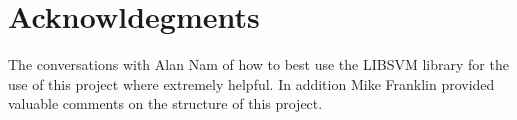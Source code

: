\section*{Acknowldegments}
The conversations with Alan Nam of how to best use the LIBSVM library for the use of this project where extremely helpful.
In addition Mike Franklin provided valuable comments on the structure of this project.
